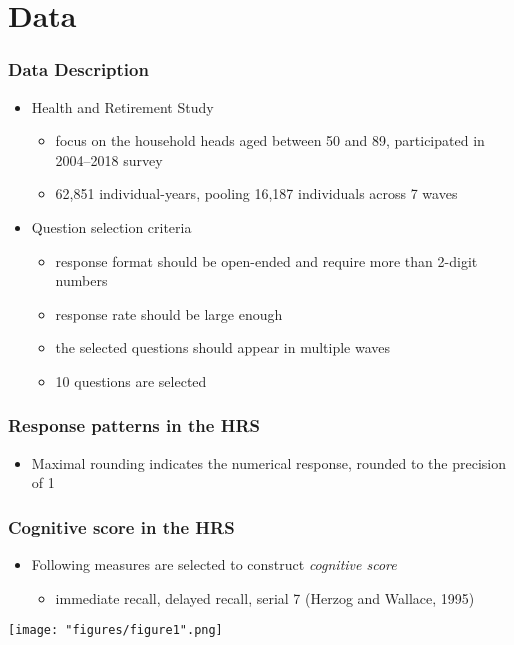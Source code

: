 \documentclass[10pt,svgnames,fragile]{beamer}
\begin{document}
{
	\AtBeginSection{}
	\section{Data}
	\begin{frame}[label = data1]
		\frametitle{Data Description} 
		\begin{itemize}
			\item Health and Retirement Study
			\begin{itemize}
				\vfill
				\item focus on the household heads aged between 50 and 89, participated in 2004--2018 survey 
				\item 62,851 individual-years, pooling 16,187 individuals across 7 waves 	\hyperlink{table1}{}
			\end{itemize}
			\vfill
			\item Question selection criteria
			\vfill
			\begin{itemize}
				\item response format should be open-ended and require more than 2-digit numbers
				\vfill
				\item response rate should be large enough
				\vfill
				\item the selected questions should appear in multiple waves 
				\vfill
				\item	10 questions are selected	
			\end{itemize}
			\vfill
		\end{itemize}
	\end{frame}
	
	
		\begin{frame}[label = data2]
		\frametitle{Response patterns in the HRS} 
	
	\begin{itemize}
		\item {\small Maximal rounding indicates the numerical response, rounded to the precision of 1}
	\end{itemize}
	\end{frame}
	
			\begin{frame}
		\frametitle{Cognitive score in the HRS} 
		\begin{itemize}
			\item Following measures are selected to construct \textit{cognitive score}
			\begin{itemize}
				\item immediate recall, delayed recall, serial 7 (Herzog and Wallace,
				1995)
			\end{itemize}
		\end{itemize}
	\begin{center}
	\texttt{[image: "figures/figure1".png]}
\end{center}
	\end{frame}
	
	
}
\end{document}
